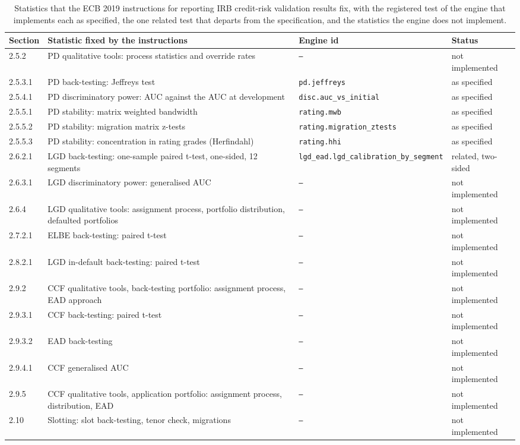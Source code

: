 \begin{table}[htbp]
\centering
\small
\caption{Statistics that the ECB 2019 instructions for reporting IRB credit-risk validation results fix, with the registered test of the engine that implements each as specified, the one related test that departs from the specification, and the statistics the engine does not implement.}
\label{tab:ecb-coverage}
\begin{tabular}{lp{5.4cm}p{4.4cm}l}
\toprule
Section & Statistic fixed by the instructions & Engine id & Status \\
\midrule
2.5.2 & PD qualitative tools: process statistics and override rates & \texttt{--} & not implemented \\
2.5.3.1 & PD back-testing: Jeffreys test & \texttt{pd.\allowbreak{}jeffreys} & as specified \\
2.5.4.1 & PD discriminatory power: AUC against the AUC at development & \texttt{disc.\allowbreak{}auc\_\allowbreak{}vs\_\allowbreak{}initial} & as specified \\
2.5.5.1 & PD stability: matrix weighted bandwidth & \texttt{rating.\allowbreak{}mwb} & as specified \\
2.5.5.2 & PD stability: migration matrix z-tests & \texttt{rating.\allowbreak{}migration\_\allowbreak{}ztests} & as specified \\
2.5.5.3 & PD stability: concentration in rating grades (Herfindahl) & \texttt{rating.\allowbreak{}hhi} & as specified \\
2.6.2.1 & LGD back-testing: one-sample paired t-test, one-sided, 12 segments & \texttt{lgd\_\allowbreak{}ead.\allowbreak{}lgd\_\allowbreak{}calibration\_\allowbreak{}by\_\allowbreak{}segment} & related, two-sided \\
2.6.3.1 & LGD discriminatory power: generalised AUC & \texttt{--} & not implemented \\
2.6.4 & LGD qualitative tools: assignment process, portfolio distribution, defaulted portfolios & \texttt{--} & not implemented \\
2.7.2.1 & ELBE back-testing: paired t-test & \texttt{--} & not implemented \\
2.8.2.1 & LGD in-default back-testing: paired t-test & \texttt{--} & not implemented \\
2.9.2 & CCF qualitative tools, back-testing portfolio: assignment process, EAD approach & \texttt{--} & not implemented \\
2.9.3.1 & CCF back-testing: paired t-test & \texttt{--} & not implemented \\
2.9.3.2 & EAD back-testing & \texttt{--} & not implemented \\
2.9.4.1 & CCF generalised AUC & \texttt{--} & not implemented \\
2.9.5 & CCF qualitative tools, application portfolio: assignment process, distribution, EAD & \texttt{--} & not implemented \\
2.10 & Slotting: slot back-testing, tenor check, migrations & \texttt{--} & not implemented \\
\bottomrule
\end{tabular}
\end{table}
